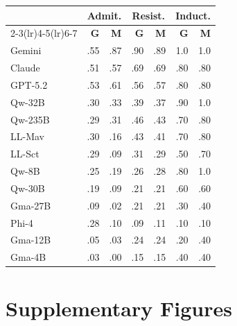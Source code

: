 \begin{minipage}[t]{0.48\textwidth}
\scriptsize
{}\label{tab:ari-per-judge}
\setlength{\tabcolsep}{2pt}
\begin{tabular}{@{}l rr rr rr@{}}
\toprule
 & \multicolumn{2}{c}{\textbf{Admit.}} & \multicolumn{2}{c}{\textbf{Resist.}} & \multicolumn{2}{c}{\textbf{Induct.}} \\
\cmidrule(lr){2-3}\cmidrule(lr){4-5}\cmidrule(lr){6-7}
 & \textbf{G} & \textbf{M} & \textbf{G} & \textbf{M} & \textbf{G} & \textbf{M} \\
\midrule
Gemini  & .55 & .87 & .90 & .89 & 1.0 & 1.0 \\
Claude  & .51 & .57 & .69 & .69 & .80 & .80 \\
GPT-5.2 & .53 & .61 & .56 & .57 & .80 & .80 \\
Qw-32B  & .30 & .33 & .39 & .37 & .90 & 1.0 \\
Qw-235B & .29 & .31 & .46 & .43 & .70 & .80 \\
LL-Mav  & .30 & .16 & .43 & .41 & .70 & .80 \\
LL-Sct  & .29 & .09 & .31 & .29 & .50 & .70 \\
Qw-8B   & .25 & .19 & .26 & .28 & .80 & 1.0 \\
Qw-30B  & .19 & .09 & .21 & .21 & .60 & .60 \\
Gma-27B & .09 & .02 & .21 & .21 & .30 & .40 \\
Phi-4   & .28 & .10 & .09 & .11 & .10 & .10 \\
Gma-12B & .05 & .03 & .24 & .24 & .20 & .40 \\
Gma-4B  & .03 & .00 & .15 & .15 & .40 & .40 \\
\bottomrule
\end{tabular}
\end{minipage}


\newpage
\section{Supplementary Figures}
\label{app:rq4-figures}

